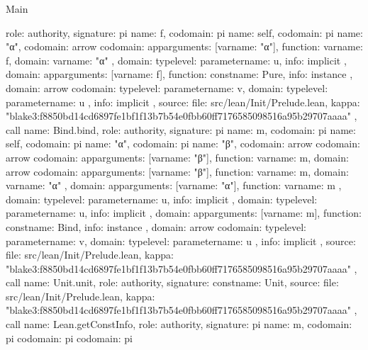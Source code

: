 \begin{lexlean}{Main}
\begin{toolingmodule}
{{      role: authority,
      signature: pi{
        name: f,
        codomain: pi{
          name: self,
          codomain: pi{
            name: "α",
            codomain: arrow{
              codomain: app{arguments: [var{name: "α"}], function: var{name: f}},
              domain: var{name: "α"}
            },
            domain: type{level: parameter{name: u}},
            info: implicit
          },
          domain: app{arguments: [var{name: f}], function: const{name: Pure}},
          info: instance
        },
        domain: arrow{
          codomain: type{level: parameter{name: v}},
          domain: type{level: parameter{name: u}}
        },
        info: implicit
      },
      source: {
        file: src/lean/Init/Prelude.lean,
        kappa: "blake3:f8850bd14cd6897fe1bf1f13b7b54e0fbb60ff7176585098516a95b29707aaaa"
      }
    },
    call{
      name: Bind.bind,
      role: authority,
      signature: pi{
        name: m,
        codomain: pi{
          name: self,
          codomain: pi{
            name: "α",
            codomain: pi{
              name: "β",
              codomain: arrow{
                codomain: arrow{
                  codomain: app{arguments: [var{name: "β"}], function: var{name: m}},
                  domain: arrow{
                    codomain: app{arguments: [var{name: "β"}], function: var{name: m}},
                    domain: var{name: "α"}
                  }
                },
                domain: app{arguments: [var{name: "α"}], function: var{name: m}}
              },
              domain: type{level: parameter{name: u}},
              info: implicit
            },
            domain: type{level: parameter{name: u}},
            info: implicit
          },
          domain: app{arguments: [var{name: m}], function: const{name: Bind}},
          info: instance
        },
        domain: arrow{
          codomain: type{level: parameter{name: v}},
          domain: type{level: parameter{name: u}}
        },
        info: implicit
      },
      source: {
        file: src/lean/Init/Prelude.lean,
        kappa: "blake3:f8850bd14cd6897fe1bf1f13b7b54e0fbb60ff7176585098516a95b29707aaaa"
      }
    },
    call{
      name: Unit.unit,
      role: authority,
      signature: const{name: Unit},
      source: {
        file: src/lean/Init/Prelude.lean,
        kappa: "blake3:f8850bd14cd6897fe1bf1f13b7b54e0fbb60ff7176585098516a95b29707aaaa"
      }
    },
    call{
      name: Lean.getConstInfo,
      role: authority,
      signature: pi{
        name: m,
        codomain: pi{
          codomain: pi{
            codomain: pi{
}}}}}}
\end{toolingmodule}
\end{lexlean}
